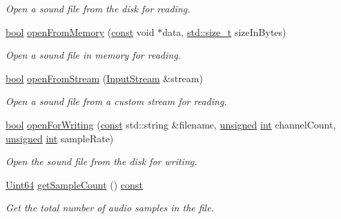 \begin{DoxyCompactItemize}
\begin{DoxyCompactList}\small\item\em Open a sound file from the disk for reading. \end{DoxyCompactList}\item 
\hyperlink{term__entry_8h_a002004ba5d663f149f6c38064926abac}{bool} \hyperlink{classsf_1_1_input_sound_file_a4e034a8e9e69ca3c33a3f11180250400}{open\-From\-Memory} (\hyperlink{term__entry_8h_a57bd63ce7f9a353488880e3de6692d5a}{const} void $\ast$data, \hyperlink{nc__alloc_8h_a7b60c5629e55e8ec87a4547dd4abced4}{std\-::size\-\_\-t} size\-In\-Bytes)
\begin{DoxyCompactList}\small\item\em Open a sound file in memory for reading. \end{DoxyCompactList}\item 
\hyperlink{term__entry_8h_a002004ba5d663f149f6c38064926abac}{bool} \hyperlink{classsf_1_1_input_sound_file_a32b76497aeb088a2b46dc6efd819b909}{open\-From\-Stream} (\hyperlink{classsf_1_1_input_stream}{Input\-Stream} \&stream)
\begin{DoxyCompactList}\small\item\em Open a sound file from a custom stream for reading. \end{DoxyCompactList}\item 
\hyperlink{term__entry_8h_a002004ba5d663f149f6c38064926abac}{bool} \hyperlink{classsf_1_1_input_sound_file_a84f32fdf5fa619538506395c3c5a030a}{open\-For\-Writing} (\hyperlink{term__entry_8h_a57bd63ce7f9a353488880e3de6692d5a}{const} std\-::string \&filename, \hyperlink{curses_8priv_8h_aca40206900cfc164654362fa8d4ad1e6}{unsigned} \hyperlink{term__entry_8h_ad65b480f8c8270356b45a9890f6499ae}{int} channel\-Count, \hyperlink{curses_8priv_8h_aca40206900cfc164654362fa8d4ad1e6}{unsigned} \hyperlink{term__entry_8h_ad65b480f8c8270356b45a9890f6499ae}{int} sample\-Rate)
\begin{DoxyCompactList}\small\item\em Open the sound file from the disk for writing. \end{DoxyCompactList}\item 
\hyperlink{namespacesf_add9ac83466d96b9f50a009b9f4064266}{Uint64} \hyperlink{classsf_1_1_input_sound_file_a0c7d3293a5b0ed6aff674d5c8bcc1cdf}{get\-Sample\-Count} () \hyperlink{term__entry_8h_a57bd63ce7f9a353488880e3de6692d5a}{const} 
\begin{DoxyCompactList}\small\item\em Get the total number of audio samples in the file. \end{DoxyCompactList}\item 

\end{DoxyCompactItemize}
